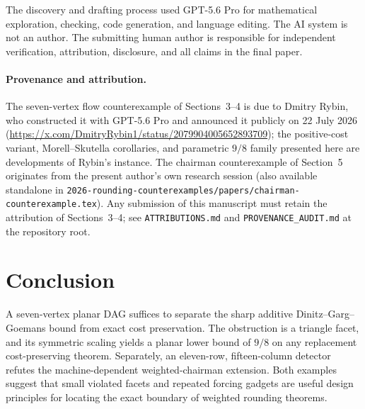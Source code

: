 \documentclass[11pt]{article}
\theoremstyle{definition}
\begin{document}
The discovery and drafting process used GPT-5.6 Pro for mathematical
exploration, checking, code generation, and language editing.  The AI system
is not an author.  The submitting human author is responsible for independent
verification, attribution, disclosure, and all claims in the final paper.

\paragraph{Provenance and attribution.}
The seven-vertex flow counterexample of Sections~3--4 is due to Dmitry Rybin,
who constructed it with GPT-5.6 Pro and announced it publicly on 22 July 2026
(\url{https://x.com/DmitryRybin1/status/2079904005652893709}); the
positive-cost variant, Morell--Skutella corollaries, and parametric $9/8$
family presented here are developments of Rybin's instance.  The chairman
counterexample of Section~5 originates from the present author's own research
session (also available standalone in
\texttt{2026-rounding-counterexamples/papers/chairman-counterexample.tex}).
Any submission of this manuscript must retain the attribution of
Sections~3--4; see \texttt{ATTRIBUTIONS.md} and \texttt{PROVENANCE\_AUDIT.md}
at the repository root.

\section{Conclusion}

A seven-vertex planar DAG suffices to separate the sharp additive
Dinitz--Garg--Goemans bound from exact cost preservation.  The obstruction is
a triangle facet, and its symmetric scaling yields a planar lower bound of
$9/8$ on any replacement cost-preserving theorem.  Separately, an eleven-row,
fifteen-column detector refutes the machine-dependent weighted-chairman
extension.  Both examples suggest that small violated facets and repeated
forcing gadgets are useful design principles for locating the exact boundary
of weighted rounding theorems.



\end{document}
